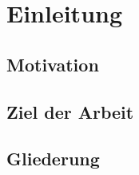 \chapter{Einleitung}\label{einleitung}

\section{Motivation}
 

\section{Ziel der Arbeit}


\section{Gliederung}
